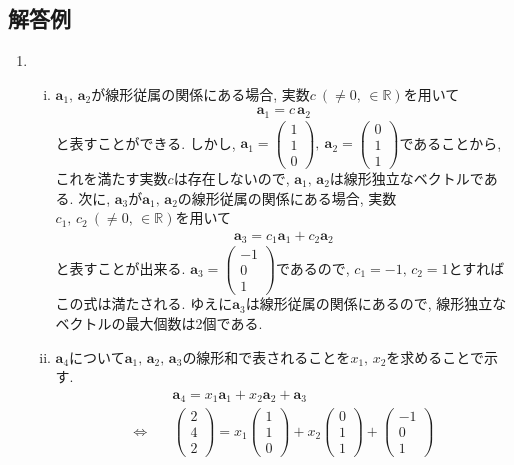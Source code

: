 \documentclass[dvipdfmx,titlepage, 11pt, a4paper]{jsarticle}%
\begin{document}
\newpage

\subsection{解答例}
\begin{enumerate}[(1)]
	\setlength{\itemsep}{10pt}
	\item
	      \begin{enumerate}[(i)]
		      \setlength{\itemsep}{10pt}
		      \item $\bm{a}_{1},\,\bm{a}_{2}$が線形従属の関係にある場合, 実数$c\ (\neq 0,\,\in \mathbb{R})$を用いて
		            \begin{eqnarray*}
			            \bm{a}_{1} = c\,\bm{a}_{2}
		            \end{eqnarray*}
		            と表すことができる. しかし, $\bm{a}_{1}=\begin{pmatrix}1\\1\\0\end{pmatrix},\ \bm{a}_{2}=\begin{pmatrix}0\\1\\1\end{pmatrix}$であることから, これを満たす実数$c$は存在しないので, $\bm{a}_{1},\,\bm{a}_{2}$は線形独立なベクトルである. 次に, $\bm{a}_{3}$が$\bm{a}_{1},\,\bm{a}_{2}$の線形従属の関係にある場合, 実数$c_{1},\,c_{2}\ (\neq 0,\,\in \mathbb{R})$を用いて
		            \begin{eqnarray*}
			            \bm{a}_{3}=c_{1}\bm{a}_{1}+c_{2}\bm{a}_{2}
		            \end{eqnarray*}
		            と表すことが出来る. $\bm{a}_{3}=\begin{pmatrix}-1\\0\\1\end{pmatrix}$であるので, $c_{1}=-1,\,c_{2}=1$とすればこの式は満たされる. ゆえに$\bm{a}_{3}$は線形従属の関係にあるので, 線形独立なベクトルの最大個数は2個である.
		      \item $\bm{a}_{4}$について$\bm{a}_{1},\,\bm{a}_{2},\,\bm{a}_{3}$の線形和で表されることを$x_{1},\,x_{2}$を求めることで示す.
		            \begin{eqnarray*}
			            && \bm{a}_{4}=x_{1}\bm{a}_{1}+x_{2}\bm{a}_{2}+\bm{a}_{3}\\
			            \Longleftrightarrow\ && \begin{pmatrix}2\\4\\2\end{pmatrix}=x_{1}\begin{pmatrix}1\\1\\0\end{pmatrix}+x_{2}\begin{pmatrix}0\\1\\1\end{pmatrix}+\begin{pmatrix}-1\\0\\1\end{pmatrix}\\

\end{eqnarray*}
\end{enumerate}
\end{enumerate}
\end{document}

